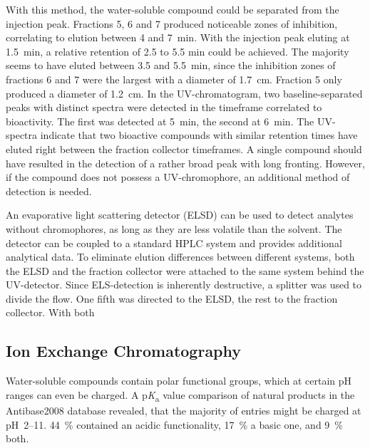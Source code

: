 	    With this method, the water-soluble compound could be separated from the injection peak. Fractions 5, 6 and 7 produced noticeable zones of inhibition, correlating to elution between 4 and 7~min. With the injection peak eluting at 1.5~min, a relative retention of 2.5 to 5.5 min could be achieved. The majority seems to have eluted between 3.5 and 5.5~min, since the inhibition zones of fractions 6 and 7 were the largest with a diameter of \SI{1.7}{\centi\meter}. Fraction 5 only produced a diameter of \SI{1.2}{\centi\meter}. In the UV-chromatogram, two baseline-separated peaks with distinct spectra were detected in the timeframe correlated to bioactivity. The first was detected at 5~min, the second at 6~min. The UV-spectra  indicate that two bioactive compounds with similar retention times have eluted right between the fraction collector timeframes. A single compound should have resulted in the detection of a rather broad peak with long fronting. However, if the compound does not possess a UV-chromophore, an additional method of detection is needed.

		An evaporative light scattering detector (ELSD) can be used to detect analytes without chromophores, as long as they are less volatile than the solvent.\autocite{Mathews2004,Righezza1988,Mourey1984,Charlesworth1978} The detector can be coupled to a standard HPLC system and provides additional analytical data. To eliminate elution differences between different systems, both the ELSD and the fraction collector were attached to the same system behind the UV-detector. Since ELS-detection is inherently destructive, a splitter was used to divide the flow. One fifth was directed to the ELSD, the rest to the fraction collector. With both 
	    
	    

    \subsection{Ion Exchange Chromatography} %
    \label{sub:results_ion_exchange_chromatography}

	Water-soluble compounds contain polar functional groups, which at certain pH ranges can even be charged.
	A p\textit{K}\textsubscript{a} value comparison of natural products in the Antibase2008 database revealed, that the majority of entries might be charged at pH~2--11.\autocite{Mansson2010}
	44~\% contained an acidic functionality, 17~\% a basic one, and 9~\% both.

